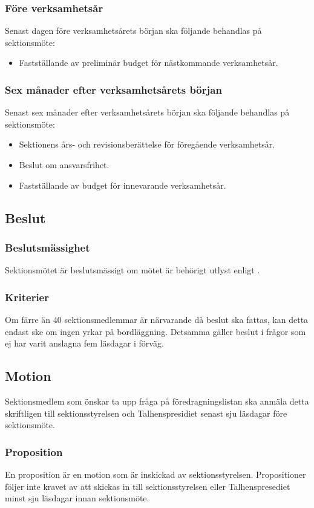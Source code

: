 \subsubsection{Före verksamhetsår}
Senast dagen före verksamhetsårets början ska följande behandlas på sektionsmöte:
\begin{itemize}
\item Fastställande av preliminär budget för nästkommande verksamhetsår.
\end{itemize}
\subsubsection{Sex månader efter verksamhetsårets början}
Senast sex månader efter verksamhetsårets början ska följande behandlas på sektionsmöte:
\begin{itemize}
\item Sektionens års- och revisionsberättelse för föregående verksamhetsår.
\item Beslut om ansvarsfrihet.
\item Fastställande av budget för innevarande verksamhetsår.
\end{itemize}
\subsection{Beslut}
\subsubsection{Beslutsmässighet}
Sektionsmötet är beslutsmässigt om mötet är behörigt utlyst enligt .
\subsubsection{Kriterier}
Om färre än 40 sektionsmedlemmar är närvarande då beslut ska fattas, kan detta endast ske om ingen yrkar på bordläggning. Detsamma gäller beslut i frågor som ej har varit anslagna fem läsdagar i förväg.
\subsection{Motion}
Sektionsmedlem som önskar ta upp fråga på föredragningslistan ska anmäla detta skriftligen till sektionsstyrelsen och Talhenspresidiet senast sju läsdagar före sektionsmöte.
\subsubsection{Proposition}
En proposition är en motion som är inskickad av sektionsstyrelsen.
Propositioner följer inte kravet av att skickas in till sektionsstyrelsen eller Talhenspresediet minst sju läsdagar innan sektionsmöte.
